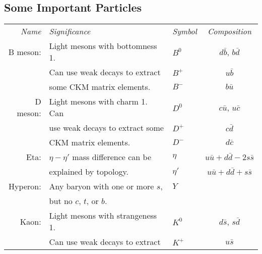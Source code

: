 \documentclass[12pt]{book}
\theoremstyle{definition}
\newenvironment{frontstuff}
  {\centering\chapter*{}}
  {\clearpage}
\begin{document}
\begin{frontstuff}
\section*{Some Important Particles}
\begin{tabularx}{\linewidth}{rLlc}
{\it Name} & {\it Significance} & {\it Symbol} & {\it Composition}
\vspace{2mm}\\
B meson: & Light mesons with bottomness 1.
                                     & $B^0$ &   $d\bar{b}$, 
                                                   $b\bar{d}$ \\
         & Can use weak decays to extract
                                     & $B^+$ &   $u\bar{b}$ \\
         & some CKM matrix elements. & $B^-$ &   $b\bar{u}$
\vspace{2mm}\\
D meson: & Light mesons with charm 1. Can
                                     & $D^0$ &   $c\bar{u}$, 
                                                   $u\bar{c}$ \\
         & use weak decays to extract some
                                     & $D^+$ &   $c\bar{d}$ \\
         & CKM matrix elements.      & $D^-$ &   $d\bar{c}$
\vspace{2mm}\\
Eta:     & $\eta-\eta'$ mass difference can be
                                     & $\eta$  &   $u\bar{u}
                                                   +d\bar{d}
                                                  -2s\bar{s}$ \\
         & explained by topology.    & $\eta'$ &   $u\bar{u}
                                                   +d\bar{d}
                                                   +s\bar{s}$
\vspace{2mm}\\
Hyperon: & Any baryon with one or more $s$,
                                     & $Y$   & \\
         & but no $c$, $t$, or $b$.  &       &
\vspace{2mm}\\
Kaon:    & Light mesons with strangeness 1.
                                     & $K^0$ &   $d\bar{s}$, 
                                                   $s\bar{d}$ \\
         & Can use weak decays to extract 
                                     & $K^+$ &   $u\bar{s}$ \\

\end{tabularx}
\end{frontstuff}
\end{document}
